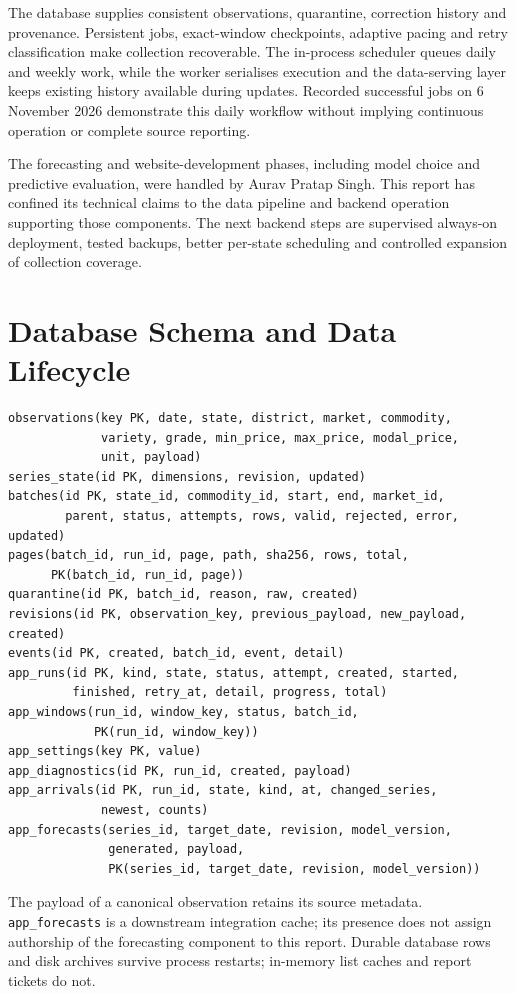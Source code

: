 \documentclass[12pt,a4paper,oneside]{report}
\newcommand{\auravname}{Aurav Pratap Singh}
\numberwithin{equation}{chapter}
\numberwithin{figure}{chapter}
\numberwithin{table}{chapter}
\theoremstyle{definition}
\begin{document}
The database supplies consistent observations, quarantine, correction history and provenance. Persistent jobs, exact-window checkpoints, adaptive pacing and retry classification make collection recoverable. The in-process scheduler queues daily and weekly work, while the worker serialises execution and the data-serving layer keeps existing history available during updates. Recorded successful jobs on 6 November 2026 demonstrate this daily workflow without implying continuous operation or complete source reporting.

The forecasting and website-development phases, including model choice and predictive evaluation, were handled by \auravname. This report has confined its technical claims to the data pipeline and backend operation supporting those components. The next backend steps are supervised always-on deployment, tested backups, better per-state scheduling and controlled expansion of collection coverage.

\appendix
\chapter{Database Schema and Data Lifecycle}
\begin{lstlisting}[caption={Simplified schema; fields omitted where not central}]
observations(key PK, date, state, district, market, commodity,
             variety, grade, min_price, max_price, modal_price,
             unit, payload)
series_state(id PK, dimensions, revision, updated)
batches(id PK, state_id, commodity_id, start, end, market_id,
        parent, status, attempts, rows, valid, rejected, error, updated)
pages(batch_id, run_id, page, path, sha256, rows, total,
      PK(batch_id, run_id, page))
quarantine(id PK, batch_id, reason, raw, created)
revisions(id PK, observation_key, previous_payload, new_payload, created)
events(id PK, created, batch_id, event, detail)
app_runs(id PK, kind, state, status, attempt, created, started,
         finished, retry_at, detail, progress, total)
app_windows(run_id, window_key, status, batch_id,
            PK(run_id, window_key))
app_settings(key PK, value)
app_diagnostics(id PK, run_id, created, payload)
app_arrivals(id PK, run_id, state, kind, at, changed_series,
             newest, counts)
app_forecasts(series_id, target_date, revision, model_version,
              generated, payload,
              PK(series_id, target_date, revision, model_version))
\end{lstlisting}

The payload of a canonical observation retains its source metadata. \texttt{app\_forecasts} is a downstream integration cache; its presence does not assign authorship of the forecasting component to this report. Durable database rows and disk archives survive process restarts; in-memory list caches and report tickets do not.
\end{document}
